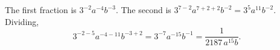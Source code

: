 The first fraction is $3^{-2}a^{-4}b^{-3}$. The second is $3^{7-2}a^{7+2+2}b^{-2}=3^5a^{11}b^{-2}$. Dividing,
\[
3^{-2-5}a^{-4-11}b^{-3+2}=3^{-7}a^{-15}b^{-1}=\boxed{\dfrac{1}{2187\,a^{15}b}}.
\]
